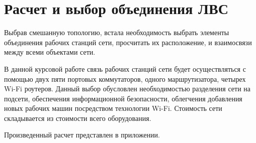 \documentclass[russian,utf8,pointsection,simple,14pt]{eskdtext}
\begin{document}
	
	\maketitle
	\maketitle
	\maketitle
	\newpage
	\tableofcontents
	
	\newpage
	
	\section{Расчет и выбор объединения ЛВС}
	Выбрав смешанную топологию, встала необходимость выбрать элементы объединения рабочих станций сети, просчитать их расположение, и взаимосвязи между всеми объектами сети.
	
	В данной курсовой работе связь рабочих станций сети будет осуществляться с помощью двух пяти портовых коммутаторов, одного маршрутизатора, четырех Wi-Fi роутеров. Данный выбор обусловлен необходимостью разделения сети на подсети, обеспечения информационной безопасности, облегчения добавления новых рабочих машин посредством технологии Wi-Fi. Стоимость сети складывается из стоимости всего оборудования.
	
	Произведенный расчет представлен в приложении.
	
\end{document}
